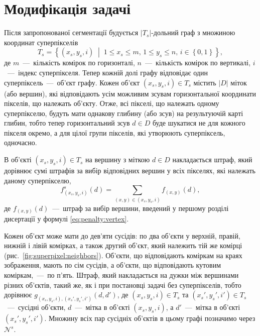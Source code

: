 \section{Модифікація задачі}

Після запропонованої сегментації будується
$\left| T_s \right|$-дольний граф з множиною координат суперпікселів
\begin{equation*}
    T_s = \left\{
        \left(x_s, y_s, i \right) \; \middle| \;
        1 \le x_s \le m, \,
        1 \le y_s \le n, \,
        i \in \left\{ 0, 1 \right\}
    \right\},
\end{equation*}
де $m$~---~кількість комірок по горизонталі,
$n$~---~кількість комірок по вертикалі,
$i$~---~індекс суперпікселя.
Тепер кожній долі графу відповідає один суперпіксель~---~об'єкт графу.
Кожен об'єкт $\left(x_s, y_s, i \right) \in T_s$ містить
$ \left| D \right|$ міток (або вершин),
які відповідають усім можливим зсувам горизонтальної координати пікселів,
що належать об'єкту.
Отже, всі пікселі, що належать одному суперпікселю,
будуть мати однакову глибину (або зсув) на результуючій карті глибин,
тобто тепер горизонтальний зсув $d \in D$
буде шукатися не для кожного пікселя окремо, а для цілої групи пікселів,
які утворюють суперпіксель, одночасно.

В об'єкті $\left(x_s, y_s, i \right) \in T_s$ на вершину з міткою $d \in D$
накладається штраф,
який дорівнює сумі штрафів за вибір відповідних вершин у всіх пікселях,
які належать даному суперпікселю,
\begin{equation*}
    f_{\left(x_s, y_s, i\right)}^s \left( d \right) =
    \sum \limits_{\left(x, y \right) \in \left(x_s, y_s, i \right)}
        f_{\left(x, y \right)} \left( d \right),
\end{equation*}
де $f_{\left(x, y \right)} \left( d \right)$~---~штраф за вибір вершини,
введений у першому розділі дисертації у формулі \eqref{eq:penalty:vertex}.

Кожен об'єкт може мати до дев'яти сусідів: по два об'єкти у верхній, правій,
нижній і лівій комірках, а також другий об'єкт,
який належить тій же комірці (рис.~\ref{fig:superpixel:neighbors}).
Об'єкти, що відповідають коміркам на краях зображення, мають по сім сусідів,
а об'єкти, що відповідають кутовим коміркам,~---~по п'ять.
Штраф, який накладається на дужки між вершинами різних об'єктів, такий же,
як і при постановці задачі без суперпікселів, тобто дорівнює
$g_{\left(x_s, y_s, i \right), \left(x_s', y_s', i' \right)}
    \left(d, d' \right)$,
де $\left(x_s, y_s, i \right) \in T_s$ та
$\left(x_s', y_s', i' \right) \in T_s$~---~сусідні об'єкти,
$d$~---~мітка в об'єкті $\left(x_s, y_s, i \right)$,
а $d'$~---~мітка в об'єкті $\left(x_s', y_s', i' \right)$.
Множину всіх пар сусідніх об'єктів в цьому графі позначимо через $\mathcal{N}^s$.

